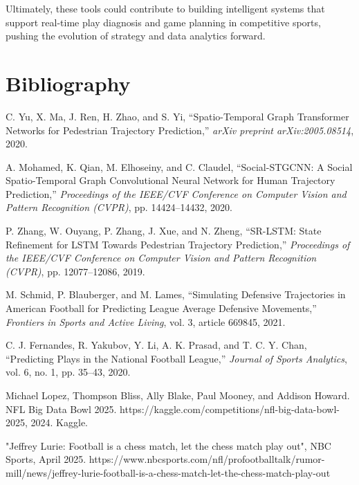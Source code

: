 \documentclass[sigconf]{acmart}
\begin{document}
Ultimately, these tools could contribute to building intelligent systems that support real-time play diagnosis and game planning in competitive sports, pushing the evolution of strategy and data analytics forward.

\section{Bibliography}

\begin{thebibliography}{99}

C. Yu, X. Ma, J. Ren, H. Zhao, and S. Yi, ``Spatio-Temporal Graph Transformer Networks for Pedestrian Trajectory Prediction,'' \textit{arXiv preprint arXiv:2005.08514}, 2020.

A. Mohamed, K. Qian, M. Elhoseiny, and C. Claudel, ``Social-STGCNN: A Social Spatio-Temporal Graph Convolutional Neural Network for Human Trajectory Prediction,'' \textit{Proceedings of the IEEE/CVF Conference on Computer Vision and Pattern Recognition (CVPR)}, pp. 14424–14432, 2020.

P. Zhang, W. Ouyang, P. Zhang, J. Xue, and N. Zheng, ``SR-LSTM: State Refinement for LSTM Towards Pedestrian Trajectory Prediction,'' \textit{Proceedings of the IEEE/CVF Conference on Computer Vision and Pattern Recognition (CVPR)}, pp. 12077–12086, 2019.

M. Schmid, P. Blauberger, and M. Lames, ``Simulating Defensive Trajectories in American Football for Predicting League Average Defensive Movements,'' \textit{Frontiers in Sports and Active Living}, vol. 3, article 669845, 2021.

C. J. Fernandes, R. Yakubov, Y. Li, A. K. Prasad, and T. C. Y. Chan, ``Predicting Plays in the National Football League,'' \textit{Journal of Sports Analytics}, vol. 6, no. 1, pp. 35–43, 2020.

Michael Lopez, Thompson Bliss, Ally Blake, Paul Mooney, and Addison Howard. NFL Big Data Bowl 2025. https://kaggle.com/competitions/nfl-big-data-bowl-2025, 2024. Kaggle.

"Jeffrey Lurie: Football is a chess match, let the chess match play out", NBC Sports, April 2025. https://www.nbcsports.com/nfl/profootballtalk/rumor-mill/news/jeffrey-lurie-football-is-a-chess-match-let-the-chess-match-play-out

\end{thebibliography}
\end{document}
